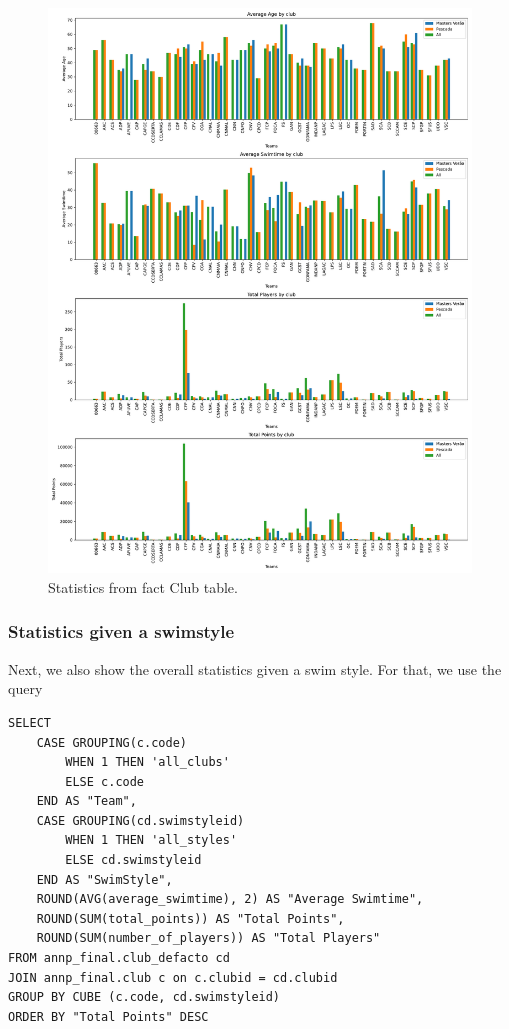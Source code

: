 \begin{figure}[H]
    \centering
    \includegraphics[width=\textwidth]{img/club_fact1.pdf}
    \caption{Statistics from fact Club table.}
    \label{fig:clubs_fact}
\end{figure}

\subsubsection{Statistics given a swimstyle}

Next, we also show the overall statistics given a swim style. For that, we use the query

\begin{verbatim}
SELECT 
    CASE GROUPING(c.code)
        WHEN 1 THEN 'all_clubs'
        ELSE c.code
    END AS "Team",
    CASE GROUPING(cd.swimstyleid)
        WHEN 1 THEN 'all_styles'
        ELSE cd.swimstyleid
    END AS "SwimStyle",
    ROUND(AVG(average_swimtime), 2) AS "Average Swimtime",
    ROUND(SUM(total_points)) AS "Total Points",
    ROUND(SUM(number_of_players)) AS "Total Players"
FROM annp_final.club_defacto cd
JOIN annp_final.club c on c.clubid = cd.clubid
GROUP BY CUBE (c.code, cd.swimstyleid)
ORDER BY "Total Points" DESC
\end{verbatim}

